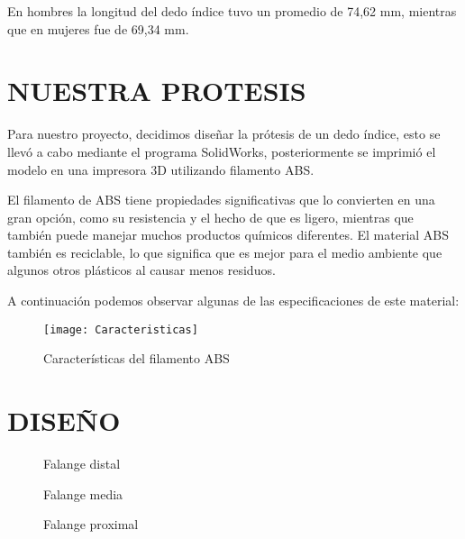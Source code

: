 \documentclass{article}
\begin{document}
En hombres la longitud del dedo índice tuvo un promedio de 74,62 mm, mientras que en mujeres fue de 69,34 mm.

\newpage
\section{NUESTRA PROTESIS}
Para nuestro proyecto, decidimos diseñar la prótesis de un dedo índice, esto se llevó a cabo mediante el programa SolidWorks, posteriormente se imprimió el modelo en una impresora 3D utilizando filamento ABS.

El filamento de ABS tiene propiedades significativas que lo convierten en una gran opción, como su resistencia y el hecho de que es ligero, mientras que también puede manejar muchos productos químicos diferentes. El material ABS también es reciclable, lo que significa que es mejor para el medio ambiente que algunos otros plásticos al causar menos residuos.

A continuación podemos observar algunas de las especificaciones de este material:


\begin{figure} [htp]%
    \centering
    \texttt{[image: Caracteristicas]} %
    \caption{Características del filamento ABS}
    \label{grafica}
\end{figure}

\section{DISEÑO}

\begin{figure}[H]
 \centering
 \caption{Falange distal}
 \label{f:animales}
\end{figure}

\begin{figure}[H]
 \centering
 \caption{Falange media}
 \label{f:animales}
\end{figure}

\begin{figure}[H]
 \centering
 \caption{Falange proximal}
 \label{f:animales}
\end{figure}
\end{document}
